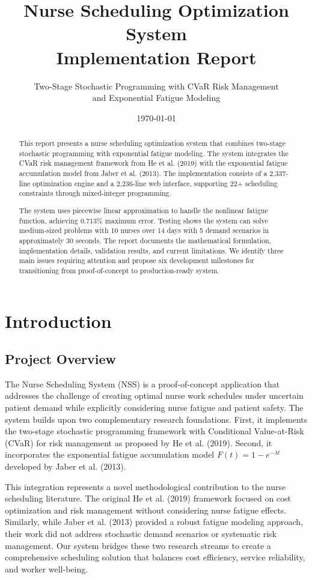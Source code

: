 \documentclass[11pt,letterpaper]{article}
\title{\textbf{Nurse Scheduling Optimization System}\\Implementation Report}
\author{Two-Stage Stochastic Programming with CVaR Risk Management\\and Exponential Fatigue Modeling}
\date{\today}
\begin{document}
\maketitle

\begin{abstract}
This report presents a nurse scheduling optimization system that combines two-stage stochastic programming with exponential fatigue modeling. The system integrates the CVaR risk management framework from He et al. (2019) with the exponential fatigue accumulation model from Jaber et al. (2013). The implementation consists of a 2,337-line optimization engine and a 2,236-line web interface, supporting 22+ scheduling constraints through mixed-integer programming.

The system uses piecewise linear approximation to handle the nonlinear fatigue function, achieving 0.713\% maximum error. Testing shows the system can solve medium-sized problems with 10 nurses over 14 days with 5 demand scenarios in approximately 30 seconds. The report documents the mathematical formulation, implementation details, validation results, and current limitations. We identify three main issues requiring attention and propose six development milestones for transitioning from proof-of-concept to production-ready system.
\end{abstract}

\tableofcontents
\newpage

\section{Introduction}

\subsection{Project Overview}
The Nurse Scheduling System (NSS) is a proof-of-concept application that addresses the challenge of creating optimal nurse work schedules under uncertain patient demand while explicitly considering nurse fatigue and patient safety. The system builds upon two complementary research foundations. First, it implements the two-stage stochastic programming framework with Conditional Value-at-Risk (CVaR) for risk management as proposed by He et al. (2019). Second, it incorporates the exponential fatigue accumulation model $F(t) = 1 - e^{-\lambda t}$ developed by Jaber et al. (2013).

This integration represents a novel methodological contribution to the nurse scheduling literature. The original He et al. (2019) framework focused on cost optimization and risk management without considering nurse fatigue effects. Similarly, while Jaber et al. (2013) provided a robust fatigue modeling approach, their work did not address stochastic demand scenarios or systematic risk management. Our system bridges these two research streams to create a comprehensive scheduling solution that balances cost efficiency, service reliability, and worker well-being.
\end{document}
